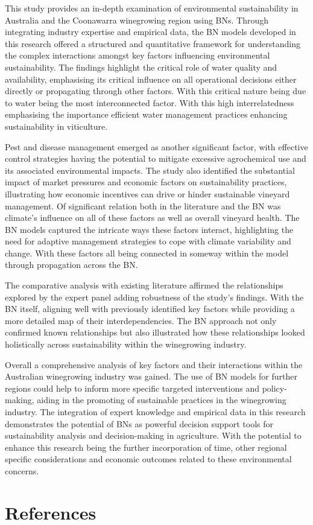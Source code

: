 This study provides an in-depth examination of environmental sustainability in Australia and the Coonawarra winegrowing region using BNs. Through integrating industry expertise and empirical data, the BN models developed in this research offered a structured and quantitative framework for understanding the complex interactions amongst key factors influencing environmental sustainability. The findings highlight the critical role of water quality and availability, emphasising its critical influence on all operational decisions either directly or propagating through other factors. With this critical nature being due to water being the most interconnected factor. With this high interrelatedness emphasising the importance efficient water management practices enhancing sustainability in viticulture.

Pest and disease management emerged as another significant factor, with effective control strategies having the potential to mitigate excessive agrochemical use and its associated environmental impacts. The study also identified the substantial impact of market pressures and economic factors on sustainability practices, illustrating how economic incentives can drive or hinder sustainable vineyard management. Of significant relation both in the literature and the BN was climate's influence on all of these factors as well as overall vineyard health. The BN models captured the intricate ways these factors interact, highlighting the need for adaptive management strategies to cope with climate variability and change. With these factors all being connected in someway within the model through propagation across the BN.

The comparative analysis with existing literature affirmed the relationships explored by the expert panel adding robustness of the study's findings. With the BN itself, aligning well with previously identified key factors while providing a more detailed map of their interdependencies. The BN approach not only confirmed known relationships but also illustrated how these relationships looked holistically across sustainability within the winegrowing industry.

Overall a comprehensive analysis of key factors and their interactions within the Australian winegrowing industry was gained. The use of BN models for further regions could help to inform more specific targeted interventions and policy-making, aiding in the promoting of sustainable practices in the winegrowing industry. The integration of expert knowledge and empirical data in this research demonstrates the potential of BNs as powerful decision support tools for sustainability analysis and decision-making in agriculture. With the potential to enhance this research being the further incorporation of time, other regional specific considerations and economic outcomes related to these environmental concerns.

\section{References}




